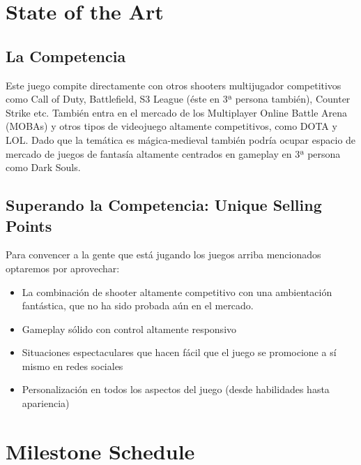 \documentclass[12pt]{article}
\begin{document}
\newpage
\section{State of the Art}
\subsection{La Competencia}
Este juego compite directamente con otros shooters multijugador competitivos como Call of Duty, Battlefield, S3 League (éste en 3ª persona también), Counter Strike etc. También entra en el mercado de los Multiplayer Online Battle Arena (MOBAs) y otros tipos de videojuego altamente competitivos, como DOTA y LOL. Dado que la temática es mágica-medieval también podría ocupar espacio de mercado de juegos de fantasía altamente centrados en gameplay en 3ª persona como Dark Souls.

\subsection{Superando la Competencia: Unique Selling Points}
Para convencer a la gente que está jugando los juegos arriba mencionados optaremos por aprovechar:

\begin{itemize}
\item La combinación de shooter altamente competitivo con una ambientación fantástica, que no ha sido probada aún en el mercado.
\item Gameplay sólido con control altamente responsivo
\item Situaciones espectaculares que hacen fácil que el juego se promocione a sí mismo en redes sociales
\item Personalización en todos los aspectos del juego (desde habilidades hasta apariencia)
\end{itemize}

\newpage

\section{Milestone Schedule}
\end{document}
